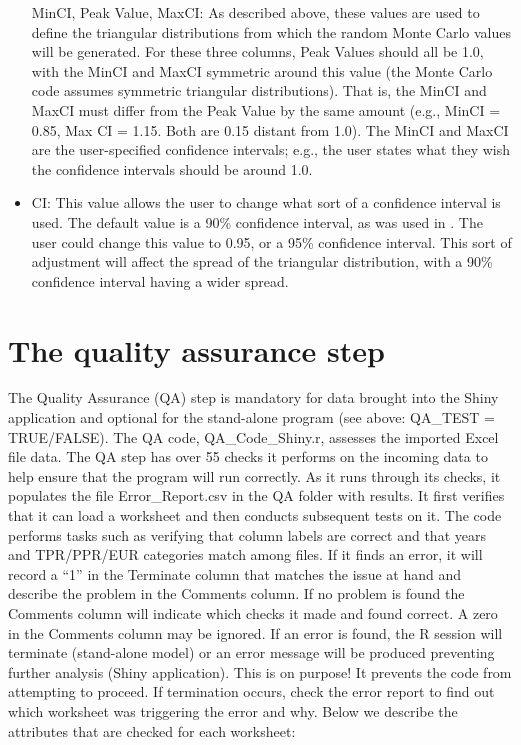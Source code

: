 \documentclass[
]{book}
\begin{document}
\begin{itemize}
  MinCI, Peak Value, MaxCI: As described above, these values are used to define the triangular distributions from which the random Monte Carlo values will be generated. For these three columns, Peak Values should all be 1.0, with the MinCI and MaxCI symmetric around this value (the Monte Carlo code assumes symmetric triangular distributions). That is, the MinCI and MaxCI must differ from the Peak Value by the same amount (e.g., MinCI = 0.85, Max CI = 1.15. Both are 0.15 distant from 1.0). The MinCI and MaxCI are the user-specified confidence intervals; e.g., the user states what they wish the confidence intervals should be around 1.0.
\item
  CI: This value allows the user to change what sort of a confidence interval is used. The default value is a 90\% confidence interval, as was used in \citet{stockmann2012}. The user could change this value to 0.95, or a 95\% confidence interval. This sort of adjustment will affect the spread of the triangular distribution, with a 90\% confidence interval having a wider spread.
\end{itemize}

\hypertarget{own-qa}{%
\section{The quality assurance step}\label{own-qa}}

The Quality Assurance (QA) step is mandatory for data brought into the Shiny application and optional for the stand-alone program (see above: QA\_TEST = TRUE/FALSE). The QA code, QA\_Code\_Shiny.r, assesses the imported Excel file data. The QA step has over 55 checks it performs on the incoming data to help ensure that the program will run correctly. As it runs through its checks, it populates the file Error\_Report.csv in the QA folder with results. It first verifies that it can load a worksheet and then conducts subsequent tests on it. The code performs tasks such as verifying that column labels are correct and that years and TPR/PPR/EUR categories match among files. If it finds an error, it will record a ``1'' in the Terminate column that matches the issue at hand and describe the problem in the Comments column. If no problem is found the Comments column will indicate which checks it made and found correct. A zero in the Comments column may be ignored. If an error is found, the R session will terminate (stand-alone model) or an error message will be produced preventing further analysis (Shiny application). This is on purpose! It prevents the code from attempting to proceed. If termination occurs, check the error report to find out which worksheet was triggering the error and why. Below we describe the attributes that are checked for each worksheet:
\end{document}
